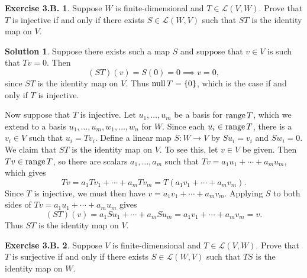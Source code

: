 \documentclass[12pt]{article}
\theoremstyle{definition}
\theoremstyle{exercise}
\newtheorem{exercise}{Exercise 3.B.}
\theoremstyle{solution}
\newtheorem*{solution}{Solution}
\newcommand{\lmap}{\mathcal{L}}
\newcommand{\Null}{\text{null\,}}
\newcommand{\Range}{\text{range\,}}
\begin{document}
\begin{exercise}
\label{ex:20}
    Suppose \( W \) is finite-dimensional and \( T \in \lmap(V, W) \). Prove that \( T \) is injective if and only if there exists \( S \in \lmap(W, V) \) such that \( ST \) is the identity map on \( V \).
\end{exercise}

\begin{solution}
    Suppose there exists such a map \( S \) and suppose that \( v \in V \) is such that \( Tv = 0 \). Then
    \[
        (ST)(v) = S(0) = 0 \implies v = 0,
    \]
    since \( ST \) is the identity map on \( V \). Thus \( \Null T = \{ 0 \} \), which is the case if and only if \( T \) is injective.

    Now suppose that \( T \) is injective. Let \( u_1, \ldots, u_m \) be a basis for \( \Range T \), which we extend to a basis \( u_1, \ldots, u_m, w_1, \ldots, w_n \) for \( W \). Since each \( u_i \in \Range T \), there is a \( v_i \in V \) such that \( u_i = Tv_i \). Define a linear map \( S : W \to V \) by \( Su_i = v_i \) and \( Sw_i = 0 \). We claim that \( ST \) is the identity map on \( V \). To see this, let \( v \in V \) be given. Then \( Tv \in \Range T \), so there are scalars \( a_1, \ldots, a_m \) such that \( Tv = a_1 u_1 + \cdots + a_m u_m \), which gives
    \[
        Tv = a_1 Tv_1 + \cdots + a_m Tv_m = T(a_1 v_1 + \cdots + a_m v_m).
    \]
    Since \( T \) is injective, we must then have \( v = a_1 v_1 + \cdots + a_m v_m \). Applying \( S \) to both sides of \( Tv = a_1 u_1 + \cdots + a_m u_m \) gives
    \[
        (ST)(v) = a_1 Su_1 + \cdots + a_m Su_m = a_1 v_1 + \cdots + a_m v_m = v.
    \]
    Thus \( ST \) is the identity map on \( V \).
\end{solution}

\begin{exercise}
\label{ex:21}
    Suppose \( V \) is finite-dimensional and \( T \in \lmap(V, W) \). Prove that \( T \) is surjective if and only if there exists \( S \in \lmap(W, V) \) such that \( TS \) is the identity map on \( W \).
\end{exercise}
\end{document}
